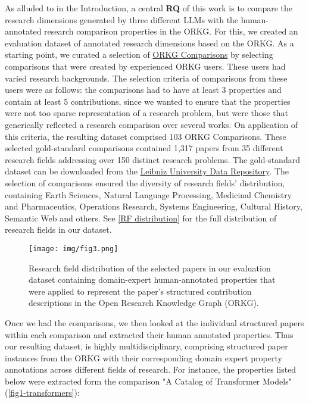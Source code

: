 As alluded to in the Introduction, a central \textbf{RQ} of this work is to compare the research dimensions generated by three different LLMs with the human-annotated research comparison properties in the ORKG. For this, we created an evaluation dataset of annotated research dimensions based on the ORKG. As a starting point, we curated a selection of \href{https://orkg.org/comparisons}{ORKG Comparisons} by selecting comparisons that were created by experienced ORKG users. These users had varied research backgrounds. The selection criteria of comparisons from these users were as follows: the comparisons had to have at least 3 properties and contain at least 5 contributions, since we wanted to ensure that the properties were not too sparse representation of a research problem, but were those that generically reflected a research comparison over several works. On application of this criteria, the resulting dataset comprised 103 ORKG Comparisons. These selected gold-standard comparisons contained 1,317 papers from 35 different research fields addressing over 150 distinct research problems. The gold-standard dataset can be downloaded from the \href{ https://doi.org/10.25835/6oyn9d1n}{Leibniz University Data Repository}. The selection of comparisons ensured the diversity of research fields’ distribution, containing Earth Sciences, Natural Language Processing, Medicinal Chemistry and Pharmaceutics, Operations Research, Systems Engineering, Cultural History, Semantic Web and others. See \autoref{RF distribution} for the full distribution of research fields in our dataset. 

\begin{figure}[!htb]
\centering
\texttt{[image: img/fig3.png]}
\caption{Research field distribution of the selected papers in our evaluation dataset containing domain-expert human-annotated properties that were applied to represent the paper's structured contribution descriptions in the Open Research Knowledge Graph (ORKG). \label{RF distribution}}
\end{figure} 

Once we had the comparisons, we then looked at the individual structured papers within each comparison and extracted their human annotated properties. Thus our resulting dataset, is highly multidisciplinary, comprising structured paper instances from the ORKG with their corresponding domain expert property annotations across different fields of research. For instance, the properties listed below were extracted form the comparison "A Catalog of Transformer Models" (\autoref{fig1-transformers}): 

